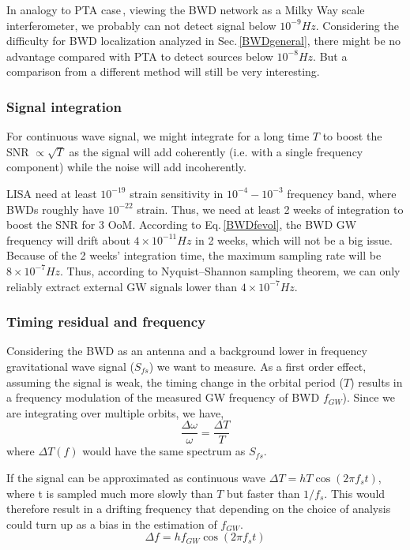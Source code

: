 \documentclass{article}
\begin{document}
In analogy to PTA case\,\cite{Moore2015}, viewing the BWD network as a Milky Way scale interferometer, we probably can not detect signal below $10^{-9}Hz$. Considering the difficulty for BWD localization analyzed in Sec.\,\ref{BWDgeneral}, there might be no advantage compared with PTA to detect sources below $10^{-8}Hz$. But a comparison from a different method will still be very interesting.

\subsubsection*{Signal integration}
For continuous wave signal, we might integrate for a long time $T$ to boost the SNR $\propto\sqrt{T}$ as the signal will add coherently (i.e. with a single frequency component) while the noise will add incoherently. 

LISA need at least $10^{-19}$ strain sensitivity in $10^{-4}-10^{-3}$ frequency band, where BWDs roughly have $10^{-22}$ strain. Thus, we need at least 2 weeks of integration to boost the SNR for 3 OoM. According to Eq.\,\eqref{BWDfevol}, the BWD GW frequency 
will drift about $4\times10^{-11}Hz$ in 2 weeks, which will not be a big issue. Because of the 2 weeks' integration time, the maximum sampling rate will be $8\times10^{-7}Hz$. Thus, according to Nyquist–Shannon sampling theorem, we can only reliably extract external GW signals lower than $4\times10^{-7}Hz$.

\subsubsection*{Timing residual and frequency}
Considering the BWD as an antenna and a background lower in frequency gravitational wave signal ($S_{fs}$) we want to measure. As a first order effect, assuming the signal is weak, the timing change in the orbital period ($T$) results in a frequency modulation of the measured GW frequency of BWD $f_{GW}$). Since we are integrating over multiple orbits, we have,
$$\frac{\Delta \omega}{\omega} = \frac{\Delta T}{T}$$
where $\Delta T(f)$ would have the same spectrum as $S_{fs}$.

If the signal can be approximated as continuous wave $\Delta T = hT\cos(2\pi f_s t)$, where t is sampled much more slowly than $T$ but faster than $1/f_s$. This would therefore result in a drifting frequency that depending on the choice of analysis could turn up as a bias in the estimation of $f_{GW}$.
$$\Delta f = hf_{GW}\cos(2\pi f_s t)$$
\end{document}
